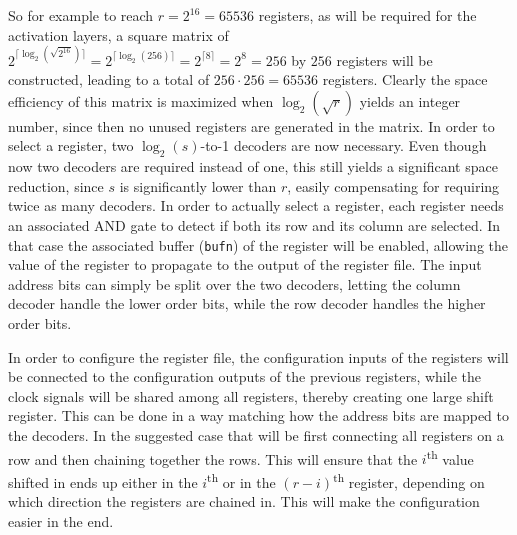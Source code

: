\begin{itemize}
    So for example to reach $r = 2^{16} = 65536$ registers, as will be required for the activation layers, a square matrix of $2^{\lceil\log_{2}(\sqrt{2^{16}})\rceil} = 2^{\lceil\log_{2}(256)\rceil} = 2^{\lceil8\rceil} = 2^{8} = 256$ by $256$ registers will be constructed, leading to a total of $256 \cdot 256 = 65536$ registers. Clearly the space efficiency of this matrix is maximized when $\log_{2}(\sqrt{r})$ yields an integer number, since then no unused registers are generated in the matrix. In order to select a register, two $\log_{2}(s)$-to-1 decoders are now necessary. Even though now two decoders are required instead of one, this still yields a significant space reduction, since $s$ is significantly lower than $r$, easily compensating for requiring twice as many decoders. In order to actually select a register, each register needs an associated AND gate to detect if both its row and its column are selected. In that case the associated buffer (\texttt{bufn}) of the register will be enabled, allowing the value of the register to propagate to the output of the register file. The input address bits can simply be split over the two decoders, letting the column decoder handle the lower order bits, while the row decoder handles the higher order bits.
    
    In order to configure the register file, the configuration inputs of the registers will be connected to the configuration outputs of the previous registers, while the clock signals will be shared among all registers, thereby creating one large shift register. This can be done in a way matching how the address bits are mapped to the decoders. In the suggested case that will be first connecting all registers on a row and then chaining together the rows. This will ensure that the $i$\textsuperscript{th} value shifted in ends up either in the $i$\textsuperscript{th} or in the $(r - i)$\textsuperscript{th} register, depending on which direction the registers are chained in. This will make the configuration easier in the end.
    

\end{itemize}

